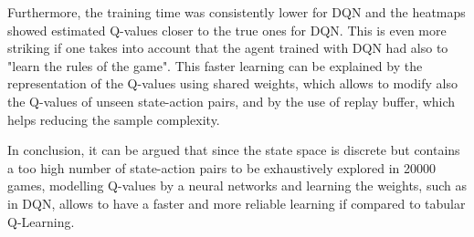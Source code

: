 \documentclass[10pt]{IEEEtran}
\begin{document}
Furthermore, the training time was consistently lower for DQN and the heatmaps showed estimated Q-values closer to the true ones for DQN. This is even more striking if one takes into account that the agent trained with DQN had also to "learn the rules of the game". This faster learning can be explained by the representation of the Q-values using shared weights, which allows to modify also the Q-values of unseen state-action pairs, and by the use of replay buffer, which helps reducing the sample complexity.

In conclusion, it can be argued that since the state space is discrete but contains a too high number of state-action pairs to be exhaustively explored in 20000 games, modelling Q-values by a neural networks and learning the weights, such as in DQN, allows to have a faster and more reliable learning if compared to tabular Q-Learning.

\nocite{*}
\printbibliography

\clearpage
{}
\end{document}
